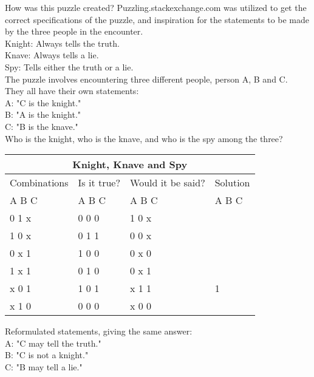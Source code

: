 \documentclass[11pt]{amsart}
\begin{document}
How was this puzzle created?
	Puzzling.stackexchange.com was utilized to get the correct specifications of the puzzle,
	and inspiration for the statements to be made by the three people in the encounter. \\

Knight: Always tells the truth.\\
Knave: 	Always tells a lie.\\
Spy: 		Tells either the truth or a lie. \\

The puzzle involves encountering three different people, person A, B and C. \\

They all have their own statements: \\

	A: "C is the knight."\\
	B: "A is the knight."\\
	C: "B is the knave." \\

Who is the knight, who is the knave, and who is the spy among the three? \\

\begin{tabular}{ |p{3cm}||p{3cm}|p{3cm}|p{3cm}|  }
 \hline
 \multicolumn{4}{|c|}{Knight, Knave and Spy} \\
 \hline
 Combinations & Is it true? & Would it be said? & Solution  \\ A  B  C   &   A  B  C  &   A  B  C & A  B  C \\
 \hline
	0   1   x  	& 0	0	0   & 1 0 x &  \\
	1   0   x		& 0	1	1  	& 0 0 x &  \\
	0   x   1 	&	1	0	0 	& 0 x 0 &  \\
	1   x   1  	&	0	1	0 	& 0 x 1 &  \\
	x   0   1		& 1	0	1  	& x 1 1 & 1\\
	x   1   0		& 0	0	0  	& x 0 0 &  \\

 \hline
\end{tabular}

Reformulated statements, giving the same answer:\\

	A: "C may tell the truth."\\
	B: "C is not a knight."\\
	C: "B may tell a lie." \\
\end{document}
